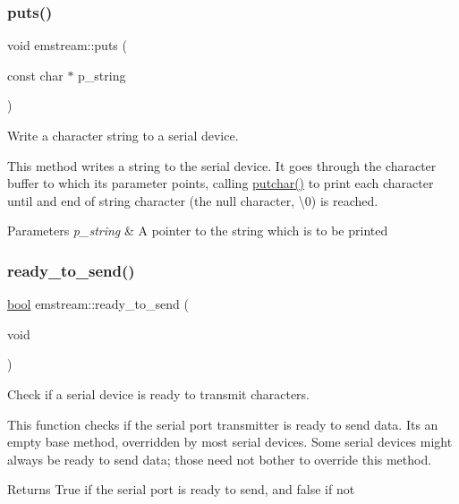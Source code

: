\mbox{\label{classemstream_a1ad530cbebe6c54640c1db8c1b9afda2}} 
\subsubsection{\texorpdfstring{puts()}{puts()}}
{\footnotesize\ttfamily void emstream\+::puts (\begin{DoxyParamCaption}\item[{const char $\ast$}]{p\+\_\+string }\end{DoxyParamCaption})}



Write a character string to a serial device. 

This method writes a string to the serial device. It goes through the character buffer to which its parameter points, calling {\ttfamily \mbox{\hyperlink{classemstream_aa4dffc9aa58f601cc4153b4cbe65d757}{putchar()}}} to print each character until and end of string character (the null character, {\ttfamily \textquotesingle{}\textbackslash{}0\textquotesingle{}}) is reached. 
\begin{DoxyParams}{Parameters}
{\em p\+\_\+string} & A pointer to the string which is to be printed \\
\hline
\end{DoxyParams}
\mbox{\label{classemstream_a28149c19ad19d10d89ca8dd3d3803b1a}} 
\subsubsection{\texorpdfstring{ready\+\_\+to\+\_\+send()}{ready\_to\_send()}}
{\footnotesize\ttfamily \mbox{\hyperlink{group___motor___boolean___type_ga0ecf26b576b9a54eca656b9be7ba6a06}{bool}} emstream\+::ready\+\_\+to\+\_\+send (\begin{DoxyParamCaption}\item[{void}]{ }\end{DoxyParamCaption})\hspace{0.3cm}{\ttfamily [virtual]}}



Check if a serial device is ready to transmit characters. 

This function checks if the serial port transmitter is ready to send data. It\textquotesingle{}s an empty base method, overridden by most serial devices. Some serial devices might always be ready to send data; those need not bother to override this method. \begin{DoxyReturn}{Returns}
True if the serial port is ready to send, and false if not 
\end{DoxyReturn}
\mbox{\label{classemstream_a3ef6ddf641176d416f9ae6a5c4cfc067}} 
